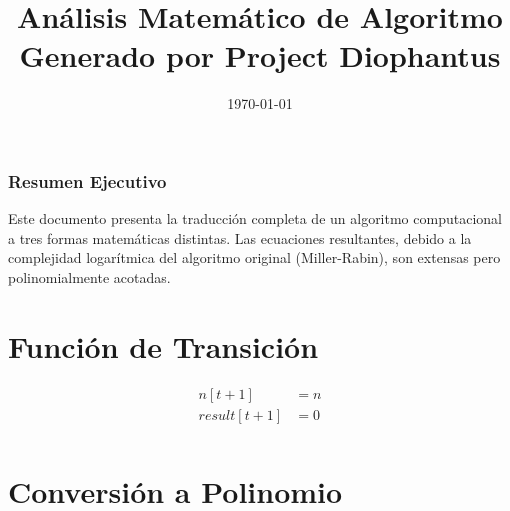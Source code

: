 \documentclass[10pt, a4paper]{article}
\title{Análisis Matemático de Algoritmo \\ \large Generado por Project Diophantus}
\author{}
\date{\today}
\begin{document}
\maketitle
\section*{Resumen Ejecutivo}
Este documento presenta la traducción completa de un algoritmo computacional a tres formas matemáticas distintas.
Las ecuaciones resultantes, debido a la complejidad logarítmica del algoritmo original (Miller-Rabin), son extensas pero polinomialmente acotadas.
\part{Función de Transición}
\begin{align*}
n[t+1] &= n \\
result[t+1] &= 0 \\
\end{align*}\part{Conversión a Polinomio}
\end{document}
